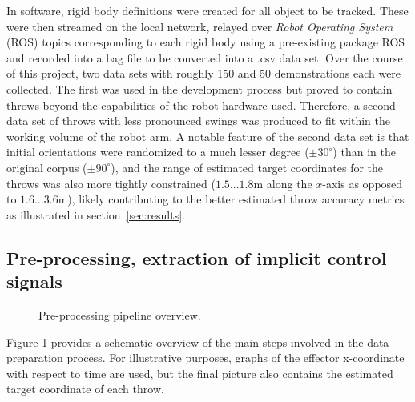 \documentclass{article}
\begin{document}
In software, rigid body definitions were created for all object to be tracked. These were then streamed on the local network, relayed over \emph{Robot Operating System} (ROS) topics corresponding to each rigid body using a pre-existing package ROS and recorded into a bag file to be converted into a .csv data set. Over the course of this project, two data sets with roughly 150 and 50 demonstrations each were collected. The first was used in the development process but proved to contain throws beyond the capabilities of the robot hardware used. Therefore, a second data set of throws with less pronounced swings was produced to fit within the working volume of the robot arm. A notable feature of the second data set is that initial orientations were randomized to a much lesser degree ($\pm30^{\circ}$) than in the original corpus ($\pm90^{\circ}$), and the range of estimated target coordinates for the throws was also more tightly constrained ($1.5 ... 1.8$m along the $x$-axis as opposed to $1.6 ... 3.6$m), likely contributing to the better estimated throw accuracy metrics as illustrated in section~\ref{sec:results}.

\subsection{Pre-processing, extraction of implicit control signals}
\label{sec:preprocess}

\begin{figure}
	\centering
	\caption{Pre-processing pipeline overview.}
	\label{fig:fig2}
\end{figure}

Figure \ref{fig:fig2} provides a schematic overview of the main steps involved in the data preparation process. For illustrative purposes, graphs of the effector x-coordinate with respect to time are used, but the final picture also contains the estimated target coordinate of each throw.
\end{document}
